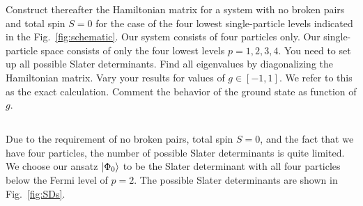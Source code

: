 Construct thereafter the Hamiltonian matrix for a system with no broken pairs and total spin $S = 0$ for the case of the four lowest single-particle levels indicated in the Fig.~\ref{fig:schematic}.
Our system consists of four particles only.
Our single-particle space consists of only the four lowest levels $p= 1, 2, 3, 4$.
You need to set up all possible Slater determinants.
Find all eigenvalues by diagonalizing the Hamiltonian matrix.
Vary your results for values of $g \in [-1, 1]$.
We refer to this as the exact calculation.
Comment the behavior of the ground state as function of $g$.

\subsection{}
Due to the requirement of no broken pairs, total spin $S = 0$, and the fact that we have four particles, the number of possible Slater determinants is quite limited.
We choose our ansatz $\lvert\Phi_0\rangle$ to be the Slater determinant with all four particles below the Fermi level of $p = 2$.
The possible Slater determinants are shown in Fig.~\ref{fig:SDs}.

